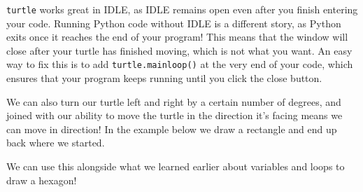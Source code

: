 		\begin{aside}
			\texttt{turtle} works great in IDLE, as IDLE remains open even after you finish entering your code. Running Python code without IDLE is a different story, as Python exits once it reaches the end of your program! This means that the window will close after your turtle has finished moving, which is not what you want. An easy way to fix this is to add \texttt{turtle.mainloop()} at the very end of your code, which ensures that your program keeps running until you click the close button.
		\end{aside}

		\webclearpage

		We can also turn our turtle left and right by a certain number of degrees, and joined with our ability to move the turtle in the direction it's facing means we can move in direction! In the example below we draw a rectangle and end up back where we started.

		

		We can use this alongside what we learned earlier about variables and loops to draw a hexagon!

		
